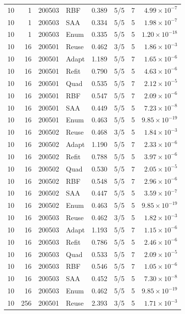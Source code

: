 \begin{longtable}{rrrlrrrr}
10 & 1 & 200503 & RBF & 0.389 & 5/5 & 7 & $4.99\times10^{-7}$\\
10 & 1 & 200503 & SAA & 0.334 & 5/5 & 5 & $1.98\times10^{-7}$\\
10 & 1 & 200503 & Enum & 0.335 & 5/5 & 5 & $1.20\times10^{-18}$\\
10 & 16 & 200501 & Reuse & 0.462 & 3/5 & 5 & $1.86\times10^{-3}$\\
10 & 16 & 200501 & Adapt & 1.189 & 5/5 & 7 & $1.65\times10^{-6}$\\
10 & 16 & 200501 & Refit & 0.790 & 5/5 & 5 & $4.63\times10^{-6}$\\
10 & 16 & 200501 & Quad & 0.535 & 5/5 & 7 & $2.12\times10^{-5}$\\
10 & 16 & 200501 & RBF & 0.547 & 5/5 & 7 & $2.09\times10^{-6}$\\
10 & 16 & 200501 & SAA & 0.449 & 5/5 & 5 & $7.23\times10^{-8}$\\
10 & 16 & 200501 & Enum & 0.463 & 5/5 & 5 & $9.85\times10^{-19}$\\
10 & 16 & 200502 & Reuse & 0.468 & 3/5 & 5 & $1.84\times10^{-3}$\\
10 & 16 & 200502 & Adapt & 1.190 & 5/5 & 7 & $2.33\times10^{-6}$\\
10 & 16 & 200502 & Refit & 0.788 & 5/5 & 5 & $3.97\times10^{-6}$\\
10 & 16 & 200502 & Quad & 0.530 & 5/5 & 7 & $2.05\times10^{-5}$\\
10 & 16 & 200502 & RBF & 0.548 & 5/5 & 7 & $2.96\times10^{-6}$\\
10 & 16 & 200502 & SAA & 0.447 & 5/5 & 5 & $3.59\times10^{-7}$\\
10 & 16 & 200502 & Enum & 0.463 & 5/5 & 5 & $9.85\times10^{-19}$\\
10 & 16 & 200503 & Reuse & 0.462 & 3/5 & 5 & $1.82\times10^{-3}$\\
10 & 16 & 200503 & Adapt & 1.193 & 5/5 & 7 & $1.15\times10^{-6}$\\
10 & 16 & 200503 & Refit & 0.786 & 5/5 & 5 & $2.46\times10^{-6}$\\
10 & 16 & 200503 & Quad & 0.533 & 5/5 & 7 & $2.09\times10^{-5}$\\
10 & 16 & 200503 & RBF & 0.546 & 5/5 & 7 & $1.05\times10^{-6}$\\
10 & 16 & 200503 & SAA & 0.452 & 5/5 & 5 & $7.30\times10^{-8}$\\
10 & 16 & 200503 & Enum & 0.462 & 5/5 & 5 & $9.85\times10^{-19}$\\
10 & 256 & 200501 & Reuse & 2.393 & 3/5 & 5 & $1.71\times10^{-3}$\\

\end{longtable}
